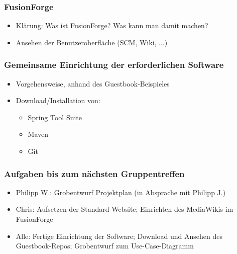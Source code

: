 \documentclass[12pt,a4paper]{article}
\begin{document}
\subsubsection*{FusionForge}
\begin{itemize}
\item Klärung: Was ist FusionForge? Was kann man damit machen?
\item Ansehen der Benutzeroberfläche (SCM, Wiki, ...)
\end{itemize}

\subsubsection*{Gemeinsame Einrichtung der erforderlichen Software}
\begin{itemize}
\item Vorgehensweise, anhand des Guestbook-Beispieles
\item Download/Installation von:
\begin{itemize}
\item Spring Tool Suite
\item Maven
\item Git
\end{itemize}
\end{itemize}

\subsubsection*{Aufgaben bis zum nächsten Gruppentreffen}
\begin{itemize}
\item Philipp W.: Grobentwurf Projektplan (in Absprache mit Philipp J.)
\item Chris: Aufsetzen der Standard-Website; Einrichten des MediaWikis im FusionForge
\item Alle: Fertige Einrichtung der Software; Download und Ansehen des Guestbook-Repos; Grobentwurf zum Use-Case-Diagramm
\end{itemize}
\end{document}
